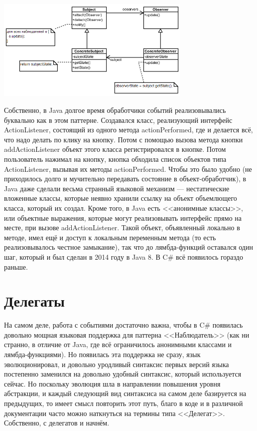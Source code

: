 \documentclass[a5paper]{article}
\begin{document}
\begin{center}
	\includegraphics[width=0.7\textwidth]{observer.png}
\end{center}

Собственно, в Java долгое время обработчики событий реализовывались буквально как в этом паттерне. Создавался класс, реализующий интерфейс ActionListener, состоящий из одного метода actionPerformed, где и делается всё, что надо делать по клику на кнопку. Потом с помощью вызова метода кнопки addActionListener объект этого класса регистрировался в кнопке. Потом пользователь нажимал на кнопку, кнопка обходила список объектов типа ActionListener, вызывая их методы actionPerformed. Чтобы это было удобно (не приходилось долго и мучительно передавать состояние в объект-обработчик), в Java даже сделали весьма странный языковой механизм --- нестатические вложенные классы, которые неявно хранили ссылку на объект объемлющего класса, который их создал. Кроме того, в Java есть <<анонимные классы>>, или объектные выражения, которые могут реализовывать интерфейс прямо на месте, при вызове addActionListener. Такой объект, объявленный локально в методе, имел ещё и доступ к локальным переменным метода (то есть реализовывалось честное замыкание), так что до лямбда-функций оставался один шаг, который и был сделан в 2014 году в Java 8. В C\# всё появилось гораздо раньше.

\section{Делегаты}

На самом деле, работа с событиями достаточно важна, чтобы в C\# появилась довольно мощная языковая поддержка для паттерна <<Наблюдатель>> (как ни странно, в отличие от Java, где всё ограничилось анонимными классами и лямбда-функциями). Но появилась эта поддержка не сразу, язык эволюционировал, и довольно уродливый синтаксис первых версий языка постепенно заменился на довольно удобный синтаксис, который используется сейчас. Но поскольку эволюция шла в направлении повышения уровня абстракции, и каждый следующий вид синтаксиса на самом деле базируется на предыдущих, то имеет смысл повторить этот путь, благо в коде и в различной документации часто можно наткнуться на термины типа <<Делегат>>. Собственно, с делегатов и начнём.
\end{document}

